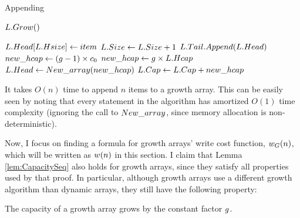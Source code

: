 \begin{algorithm}[H]
	\caption{Appending \TextGrowthArray}
	\begin{algorithmic}[1]
		\Procedure{$\FuncAppend$}{$\VarList,\ \ParamItem$}
				\State $L.Grow()$
			\EndIf
		
			\State $L.Head[L.Hsize] \gets item$
			\State $L.Size \gets L.Size + 1$
		\EndProcedure
		\Statex
		\Procedure{$\FuncGrow$}{$\VarList$}
			\State $L.Tail.Append(L.Head)$
				\State $new\_hcap \gets (g - 1) \times c_0$
			\Else
				\State $new\_hcap \gets g \times L.Hcap$
			\EndIf
			\State $L.Head \gets New\_array(new\_hcap)$
			\State $L.Cap \gets L.Cap + new\_hcap$
		\EndProcedure
	\end{algorithmic}
\end{algorithm}

\HdrTimeComplex

It takes $O(n)$ time to append $n$ items to a growth array. This can be easily seen by noting that every statement in the algorithm has amortized $O(1)$ time complexity (ignoring the call to $New\_array$, since memory allocation is non-deterministic).

Now, I focus on finding a formula for growth arrays' write cost function, $w_G(n)$, which will be written as $w(n)$ in this section. I claim that Lemma \ref{lem:CapacitySeq} also holds for growth arrays, since they satisfy all properties used by that proof. In particular, although growth arrays use a different growth algorithm than dynamic arrays, they still have the following property:

\begin{lemma}
\label{lem:GrowthArraysGrowthFactor}
	The capacity of a growth array grows by the constant factor $g$.
\end{lemma}

